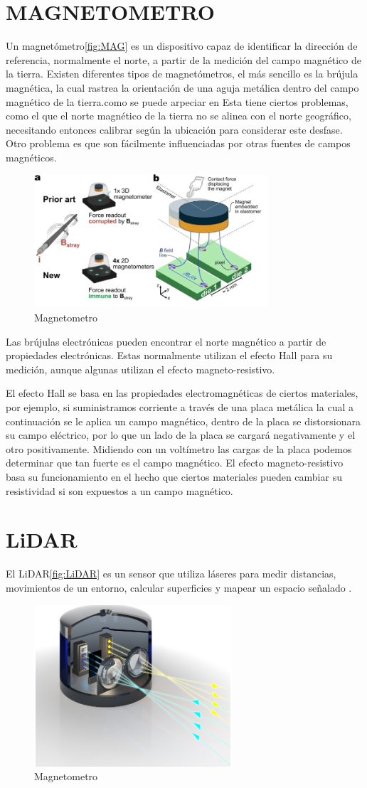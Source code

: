 \newpage
	\section{MAGNETOMETRO}
	Un magnetómetro\autoref{fig:MAG} es un dispositivo capaz de identificar la dirección de referencia, normalmente el norte, a partir de la medición del campo magnético de la tierra.
	Existen\cite{ScienceDirect_Magnetometer} diferentes tipos de magnetómetros, el más sencillo es la brújula magnética, la cual rastrea la orientación de una aguja metálica dentro del campo magnético de la tierra.como se puede arpeciar en \cite{TransducerResearch_Magnetoresistive} Esta tiene ciertos problemas, como el que el norte magnético de la tierra no se alinea con el norte geográfico, necesitando entonces calibrar según la ubicación para considerar este desfase. Otro problema es que son fácilmente influenciadas por otras fuentes de campos magnéticos. 
		\begin{figure}[h]
		\centering
		\includegraphics[width=0.3\linewidth]{img/MAG}
		\caption{Magnetometro }
		\label{fig:MAG}
	\end{figure}
	
	Las brújulas electrónicas pueden encontrar el norte magnético a partir de propiedades electrónicas. Estas normalmente utilizan el efecto Hall para su medición, aunque algunas utilizan el efecto magneto-resistivo.

	El efecto Hall se basa en las propiedades electromagnéticas de ciertos materiales, por ejemplo, si suministramos corriente a través de una placa metálica la cual a continuación se le aplica un campo magnético, dentro de la placa se distorsionara su campo eléctrico, por lo que un lado de la placa se cargará negativamente y el otro positivamente. Midiendo con un voltímetro las cargas de la placa podemos determinar que tan fuerte es el campo magnético.
	El efecto magneto-resistivo basa su funcionamiento en el hecho que ciertos materiales pueden cambiar su resistividad si son expuestos a un campo magnético.
	
	\section{LiDAR}
El LiDAR\autoref{fig:LiDAR} es un sensor que utiliza láseres para medir distancias, movimientos de un entorno, calcular superficies y mapear un espacio señalado \cite{IBM_Lidar}.
\begin{figure}[h]
	\centering
	\includegraphics[width=0.3\linewidth]{img/LiDAR}
	\caption{Magnetometro }
	\label{fig:LiDAR}
\end{figure}

